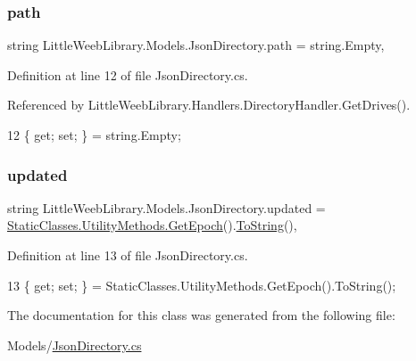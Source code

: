 \subsubsection{\texorpdfstring{path}{path}}
{\footnotesize\ttfamily string Little\+Weeb\+Library.\+Models.\+Json\+Directory.\+path = string.\+Empty\hspace{0.3cm}{\ttfamily [get]}, {\ttfamily [set]}}



Definition at line 12 of file Json\+Directory.\+cs.



Referenced by Little\+Weeb\+Library.\+Handlers.\+Directory\+Handler.\+Get\+Drives().


\begin{DoxyCode}
12 \{ \textcolor{keyword}{get}; \textcolor{keyword}{set}; \} = \textcolor{keywordtype}{string}.Empty;
\end{DoxyCode}
\mbox{\label{class_little_weeb_library_1_1_models_1_1_json_directory_aa6ff9e2e4fabee594670b7cd93fa2c69}} 
\subsubsection{\texorpdfstring{updated}{updated}}
{\footnotesize\ttfamily string Little\+Weeb\+Library.\+Models.\+Json\+Directory.\+updated = \mbox{\hyperlink{class_little_weeb_library_1_1_static_classes_1_1_utility_methods_a12336d9e64983ddabaad8950486fafb2}{Static\+Classes.\+Utility\+Methods.\+Get\+Epoch}}().\mbox{\hyperlink{class_little_weeb_library_1_1_models_1_1_json_directory_a8fb3f3abbc3d89fa3a3fc6f7966fc4f9}{To\+String}}()\hspace{0.3cm}{\ttfamily [get]}, {\ttfamily [set]}}



Definition at line 13 of file Json\+Directory.\+cs.


\begin{DoxyCode}
13 \{ \textcolor{keyword}{get}; \textcolor{keyword}{set}; \} = StaticClasses.UtilityMethods.GetEpoch().ToString();
\end{DoxyCode}


The documentation for this class was generated from the following file\+:\begin{DoxyCompactItemize}
\item 
Models/\mbox{\hyperlink{_json_directory_8cs}{Json\+Directory.\+cs}}\end{DoxyCompactItemize}
